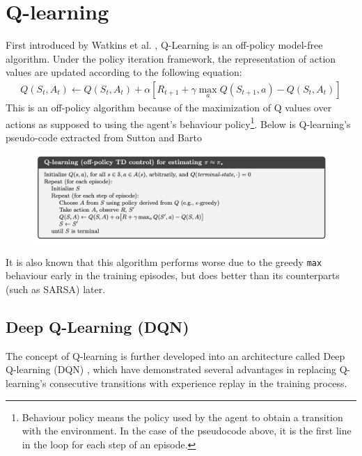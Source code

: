 \documentclass[12pt]{report}
\begin{document}
\section{Q-learning}
First introduced by Watkins et al. \cite{watkins1992q}, Q-Learning is an off-policy model-free algorithm. Under the policy iteration framework, the representation of action values are updated according to the following equation:
\begin{align}
    Q(S_t,A_t) \leftarrow Q(S_t,A_t) + \alpha\left[R_{t+1}+\gamma \max_a Q(S_{t+1},a) - Q(S_t,A_t)\right] \label{eq:bellman-q-learning}
\end{align}
This is an off-policy algorithm because of the maximization of Q values over actions as supposed to using the agent's behaviour policy\footnote{Behaviour policy means the policy used by the agent to obtain a transition with the environment. In the case of the pseudocode above, it is the first line in the loop for each step of an episode.}. Below is Q-learning's pseudo-code extracted from Sutton and Barto \cite{sutton2018reinforcement}
\begin{figure}[H]
    \center
    \includegraphics[width=0.9\linewidth]{figs/q_learning.png}
    \label{fig:qlearning}
\end{figure}
It is also known that this algorithm performs worse \cite{sutton2018reinforcement} due to the greedy \texttt{max} behaviour early in the training episodes, but does better than its counterparts (such as SARSA) later.

\subsection{Deep Q-Learning (DQN)}\label{sec:DQN}

The concept of Q-learning is further developed into an architecture called Deep Q-learning (DQN) \cite{mnih2013playing}, which have demonstrated several advantages in replacing Q-learning's consecutive transitions with experience replay in the training process.\\
\end{document}
